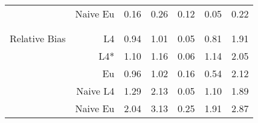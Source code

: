 \documentclass[a4paper,12pt,twoside]{book}
\begin{document}
\begin{table}[H]
\begin{tabular}{crrrrrr}
&Naive Eu &0.16 & 0.26 & 0.12 & 0.05 & 0.22 \\ \\
    \\ 
   \hline
   
{\color{blue} Relative Bias } & L4  &0.94 & 1.01 & 0.05 & 0.81 & 1.91 \\ 
   
&L4*  &1.10 & 1.16 & 0.06 & 1.14 & 2.05 \\ 
 
  
&Eu &  
   0.96 & 1.02 & 0.16 & 0.54 & 2.12 \\ 
  
&Naive L4&  
  
1.29 & 2.13 & 0.05 & 1.10 & 1.89 \\
 
  
  
&Naive Eu &  
2.04 & 3.13 & 0.25 & 1.91 & 2.87 \\ 
  
\end{tabular}

\end{table}
\end{document}
